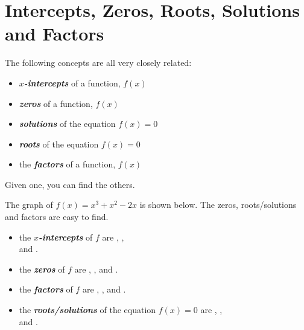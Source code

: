 \section{Intercepts, Zeros, Roots, Solutions and Factors}

\begin{myCenteredBox}[width=4in, colback=white, ]
    The following concepts are all very closely related:
    \begin{itemize}[nosep]
        \item {\bfseries\itshape $x$-intercepts} of a function, $f(x)$
        \item {\bfseries\itshape zeros} of a function, $f(x)$
        \item {\bfseries\itshape solutions} of the equation $f(x) = 0$
        \item {\bfseries\itshape roots} of the equation $f(x) = 0$
        \item the {\bfseries\itshape factors} of a function, $f(x)$
    \end{itemize}
    Given one, you can find the others.
\end{myCenteredBox}
The graph of 
{
    $f(x) = x^3 + x^2 -2x $
}
is shown below. 
The zeros, roots/solutions and factors are easy to find.
\begin{minipage}{0.3\textwidth}
\begin{center}
\end{center}
\end{minipage}
%
\begin{minipage}{0.69\textwidth}
    \begin{itemize}
        \item the {\bfseries\itshape $x$-intercepts} of $f$ are , ,\\ and .
        \item the {\bfseries\itshape zeros} of $f$ are , , and .
    \end{itemize}
    \begin{itemize}
        \item the {\bfseries\itshape factors} of $f$ are , , and .
        \item the {\bfseries\itshape roots/solutions} of the equation $f(x)=0$ are , ,\\ and .
    \end{itemize}
\end{minipage}





